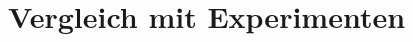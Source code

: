 \documentclass[10pt,a5paper,oneside,draft]{book}
\numberwithin{equation}{chapter}
\begin{document}
\clearpage
\chapter{Vergleich mit Experimenten}\label{sec:experimente}

\end{document}
